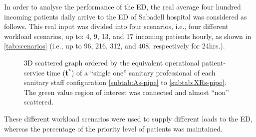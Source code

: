 In order to analyse the performance of the ED, the real average four
hundred incoming patients daily arrive to the ED of Sabadell hospital
was considered as follows. This real input was divided into four scenarios,
i.e., four different workload scenarios, up to: 4, 9, 13, and 17 incoming
patients hourly, as shown in \ref{tab:scenarios} (i.e., up to 96,
216, 312, and 408, respectively for 24hrs.).
\begin{figure}[H]
\noindent \begin{centering}
\par\end{centering}

\caption{3D scattered graph ordered by the equivalent operational patient-service
time ({\bf t$^*$}) of a ``single one'' sanitary
professional of each sanitary staff configuration \ref{subtab:As-pipe}
to \ref{subtab:XRs-pipe}. The green value region of interest was
connected and almost ``non'' scattered.\label{fig:3D-scattered-LoS-tpipe} }
\end{figure}
 These different workload scenarios were used to supply different
loads to the ED, whereas the percentage of the priority level of patients
was maintained. 

\begin{table}[H]
\centering{}\caption{Incoming ED patients divided into four different workload scenarios,
up to: 4, 9, 13, and 17 patients per hour for each scenario. \label{tab:scenarios}}
\end{table}
\clearpage{}



